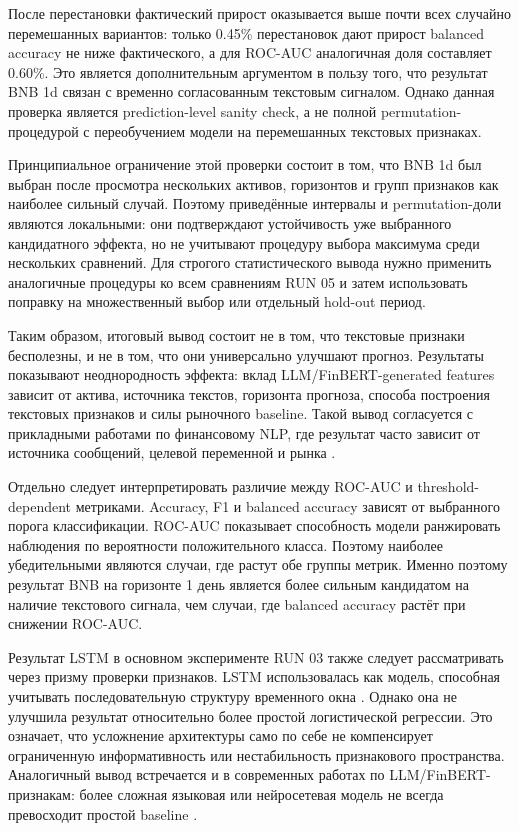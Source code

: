 После перестановки фактический прирост оказывается выше почти всех случайно перемешанных вариантов: только 0.45\% перестановок дают прирост balanced accuracy не ниже фактического, а для ROC-AUC аналогичная доля составляет 0.60\%. Это является дополнительным аргументом в пользу того, что результат BNB 1d связан с временно согласованным текстовым сигналом. Однако данная проверка является prediction-level sanity check, а не полной permutation-процедурой с переобучением модели на перемешанных текстовых признаках.

Принципиальное ограничение этой проверки состоит в том, что BNB 1d был выбран после просмотра нескольких активов, горизонтов и групп признаков как наиболее сильный случай. Поэтому приведённые интервалы и permutation-доли являются локальными: они подтверждают устойчивость уже выбранного кандидатного эффекта, но не учитывают процедуру выбора максимума среди нескольких сравнений. Для строгого статистического вывода нужно применить аналогичные процедуры ко всем сравнениям RUN 05 и затем использовать поправку на множественный выбор или отдельный hold-out период.

Таким образом, итоговый вывод состоит не в том, что текстовые признаки бесполезны, и не в том, что они универсально улучшают прогноз. Результаты показывают неоднородность эффекта: вклад LLM/FinBERT-generated features зависит от актива, источника текстов, горизонта прогноза, способа построения текстовых признаков и силы рыночного baseline. Такой вывод согласуется с прикладными работами по финансовому NLP, где результат часто зависит от источника сообщений, целевой переменной и рынка \cite{hiew2019bert,zou2022prebit,jiang2023finbert,albada2025bertweet,vuong2025llm}.

Отдельно следует интерпретировать различие между ROC-AUC и threshold-dependent метриками. Accuracy, F1 и balanced accuracy зависят от выбранного порога классификации. ROC-AUC показывает способность модели ранжировать наблюдения по вероятности положительного класса. Поэтому наиболее убедительными являются случаи, где растут обе группы метрик. Именно поэтому результат BNB на горизонте 1 день является более сильным кандидатом на наличие текстового сигнала, чем случаи, где balanced accuracy растёт при снижении ROC-AUC.

Результат LSTM в основном эксперименте RUN 03 также следует рассматривать через призму проверки признаков. LSTM использовалась как модель, способная учитывать последовательную структуру временного окна \cite{hochreiter1997lstm}. Однако она не улучшила результат относительно более простой логистической регрессии. Это означает, что усложнение архитектуры само по себе не компенсирует ограниченную информативность или нестабильность признакового пространства. Аналогичный вывод встречается и в современных работах по LLM/FinBERT-признакам: более сложная языковая или нейросетевая модель не всегда превосходит простой baseline \cite{shobayo2024sentiment,vuong2025llm}.

